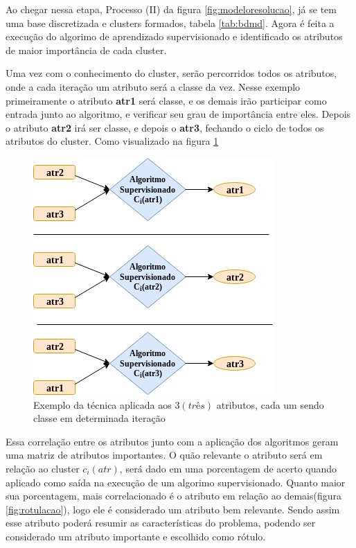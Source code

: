 Ao chegar nessa etapa, Processo (II) da figura \ref{fig:modeloresolucao}, já se tem uma base discretizada e clusters formados, tabela \ref{tab:bdmd}. Agora é feita a execução do algorimo de aprendizado supervisionado e identificado os atributos de maior importância de cada cluster.

Uma vez com o conhecimento do cluster, serão percorridos todos os atributos, onde a cada iteração um atributo será a classe da vez. Nesse exemplo primeiramente o atributo \textbf{atr1} será classe, e os demais irão participar como entrada junto ao algoritmo, e verificar seu grau de importância entre eles. Depois o atributo \textbf{atr2} irá ser classe, e depois o \textbf{atr3}, fechando o ciclo de todos os atributos do cluster. Como visualizado na figura \ref{fig:tecnicamodelocomp} 
\begin{figure}[h!]
        \centering
        \includegraphics[scale=0.7]{figs/tecnicamodeloComp.png}
        \caption{Exemplo da técnica aplicada aos ${3 (três)}$ atributos, cada um sendo classe em determinada iteração } \label{fig:tecnicamodelocomp}
\end{figure}

Essa correlação entre os atributos junto com a aplicação dos algoritmos geram uma matriz de atributos importantes. O quão relevante o atributo será em relação ao cluster ${c_i(atr)}$, será dado em uma porcentagem de acerto quando aplicado como saída na execução de um algorimo supervisionado. Quanto maior sua porcentagem, mais correlacionado é o atributo em relação ao demais(figura \ref{fig:rotulacao}), logo ele é considerado um atributo bem relevante. Sendo assim esse atributo poderá resumir as características do problema, podendo ser considerado um atributo importante e escolhido como rótulo.

